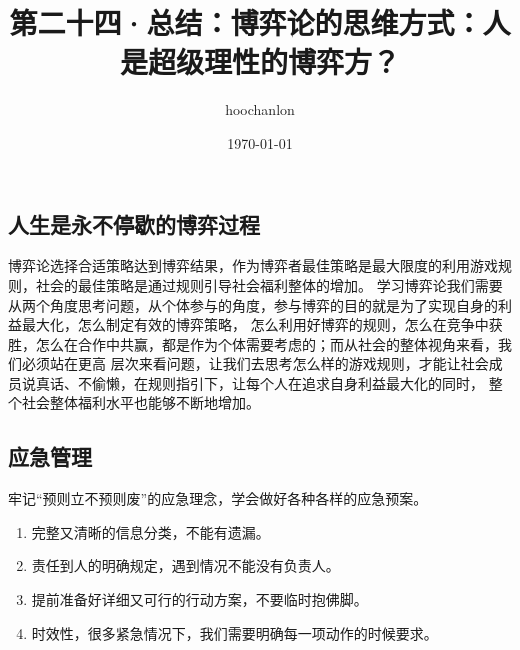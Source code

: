 \documentclass[12pt, a4paper]{article} %
\title{第二十四·总结：博弈论的思维方式：人是超级理性的博弈方？}
\author{hoochanlon}
\date{\today}
\begin{document}
	\begin{CJK*}{UTF8}{gbsn}
		\maketitle
        \clearpage
        \section{人生是永不停歇的博弈过程}
        博弈论选择合适策略达到博弈结果，作为博弈者最佳策略是最大限度的利用游戏规则，社会的最佳策略是通过规则引导社会福利整体的增加。
        学习博弈论我们需要从两个角度思考问题，从个体参与的角度，参与博弈的目的就是为了实现自身的利益最大化，怎么制定有效的博弈策略，
        怎么利用好博弈的规则，怎么在竞争中获胜，怎么在合作中共赢，都是作为个体需要考虑的；而从社会的整体视角来看，我们必须站在更高
        层次来看问题，让我们去思考怎么样的游戏规则，才能让社会成员说真话、不偷懒，在规则指引下，让每个人在追求自身利益最大化的同时，
        整个社会整体福利水平也能够不断地增加。

        \subsection{应急管理}
        牢记“预则立不预则废”的应急理念，学会做好各种各样的应急预案。
        \begin{enumerate}
            \item 完整又清晰的信息分类，不能有遗漏。
            \item 责任到人的明确规定，遇到情况不能没有负责人。
            \item 提前准备好详细又可行的行动方案，不要临时抱佛脚。
            \item 时效性，很多紧急情况下，我们需要明确每一项动作的时候要求。
        \end{enumerate}


\end{CJK*}
\end{document}
